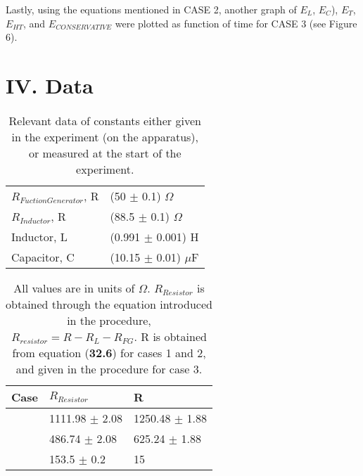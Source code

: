 \documentclass[twocolumn, letterpaper, 10pt, twoside]{article}
\begin{document}
       Lastly, using the equations mentioned in CASE 2, another graph of $E_L$, $E_C$), $E_T$, $E_{HT}$, and $E_{CONSERVATIVE}$ were plotted as function of time for CASE 3 (see Figure 6).
 
    \section*{IV. Data}

\begin{table} [H] 
	\centering
	\tabulinesep=1.5mm
	\begin{tabu} { | X[c] | X[c] | }
		
		\hline \centering
		
		$R_{Fuction Generator}$, R & (50 $\pm$ 0.1) $\Omega$ \\
		\centering
		$R_{Inductor}$, R & (88.5 $\pm$ 0.1) $\Omega$ \\
		\centering
		Inductor, L & (0.991 $\pm$ 0.001) H \\
		\centering
		Capacitor, C & (10.15 $\pm$ 0.01) $\mu$F \\
		\hline
		
   \end{tabu}
	\captionsetup{width=.8\linewidth}
	\vspace{-1mm}
	\caption{Relevant data of constants either given in the experiment (on the apparatus), or measured at the start of the experiment.}
	
\end{table}

\begin{table} [H] 
	\centering
	\tabulinesep=1.3mm
	\begin{tabu} { | X[c] | X[c] | X[c] |}
		
		\hline \centering
		
		\textbf{Case} & \textbf{$R_{Resistor}$} & \textbf{R} \\
		\hline {} & 1111.98 $\pm$ 2.08 & 1250.48 $\pm$ 1.88 \\
		 & 486.74 $\pm$ 2.08 & 625.24 $\pm$ 1.88 \\
		 & 153.5 $\pm$ 0.2 & 15 \\
		\hline
		
	\end{tabu}
	\captionsetup{width=.8\linewidth}
	\vspace{-1mm}
	\caption{All values are in units of $\Omega$. $R_{Resistor}$ is obtained through the equation introduced in the procedure,  $R_{resistor} = R - R_L - R_{FG}$. R is obtained from equation (\textbf{32.6}) for cases 1 and 2, and given in the procedure for case 3.}
	
\end{table}
\end{document}
